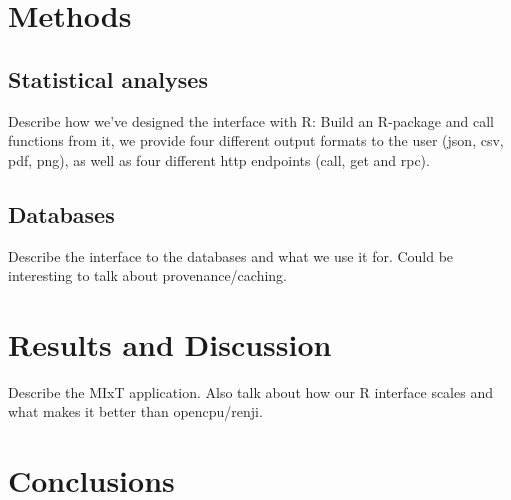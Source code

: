 
\section*{Methods}

\subsection*{Statistical analyses}
Describe how we've designed the interface with R: Build an R-package and call
functions from it, we provide four different output formats to the user
 (json, csv, pdf, png),  as well as four different http endpoints (call, get and
rpc).

\subsection*{Databases}
Describe the interface to the databases and what we use it for. Could be
interesting to talk about provenance/caching.



\section*{Results and Discussion}
Describe the MIxT application. Also talk about how our R interface scales and
what makes it better than opencpu/renji.



\section*{Conclusions}

